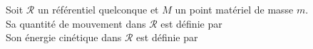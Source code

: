 \documentclass[a4paper]{article}
\begin{document}
\pagestyle{fancy}
\fancyhf{}
\setlength{\headheight}{15pt}

\begin{center}
	\large{}
\end{center}


Soit \(\mathcal{R}\) un référentiel quelconque et \(M\) un point matériel de masse \(m\).\\
Sa quantité de mouvement dans \(\mathcal{R}\) est définie par \\
Son énergie cinétique dans \(\mathcal{R}\) est définie par 
\end{document}
